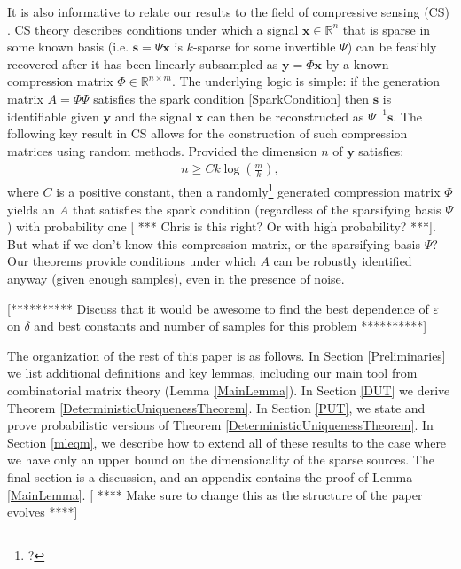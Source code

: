 \documentclass[journal, onecolumn]{IEEEtran}
\begin{document}
It is also informative to relate our results to the field of compressive sensing (CS) \cite{?}. CS theory describes conditions under which a signal $\mathbf{x} \in \mathbb{R}^n$ that is sparse in some known basis (i.e. $\mathbf{s} = \Psi \mathbf{x}$ is $k$-sparse for some invertible $\Psi$) can be feasibly recovered after it has been linearly subsampled as $\mathbf{y} = \Phi \mathbf{x}$ by a known compression matrix $\Phi \in \mathbb{R}^{n \times m}$. The underlying logic is simple: if the generation matrix $A = \Phi\Psi$ satisfies the spark condition \eqref{SparkCondition} then $\mathbf{s}$ is identifiable given $\mathbf{y}$ and the signal $\mathbf{x}$ can then be reconstructed as $\Psi^{-1}\mathbf{s}$. The following key result in CS allows for the construction of such compression matrices using random methods. Provided the dimension $n$ of $\mathbf{y}$ satisfies:
\begin{align}\label{CScondition}
n \geq Ck\log\left(\frac{m}{k}\right),
\end{align}
%
where $C$ is a positive constant, then a randomly\footnote{?} generated compression matrix $\Phi$ yields an $A$ that satisfies the spark condition (regardless of the sparsifying basis $\Psi$) with probability one [ *** Chris is this right? Or with high probability? ***]. But what if we don't know this compression matrix, or the sparsifying basis $\Psi$? Our theorems provide conditions under which $A$ can be robustly identified anyway (given enough samples), even in the presence of noise. 


[********** Discuss that it would be awesome to find the best dependence of $\varepsilon$ on $\delta$ and best constants and number of samples for this problem **********]

The organization of the rest of this paper is as follows. In Section \ref{Preliminaries} we list additional definitions and key lemmas, including our main tool from combinatorial matrix theory (Lemma \ref{MainLemma}). In Section \ref{DUT} we derive Theorem \ref{DeterministicUniquenessTheorem}. In Section \ref{PUT}, we state and prove probabilistic versions of Theorem \ref{DeterministicUniquenessTheorem}. In Section \ref{mleqm}, we describe how to extend all of these results to the case where we have only an upper bound on the dimensionality of the sparse sources. The final section is a discussion, and an appendix contains the proof of Lemma \ref{MainLemma}.
[ **** Make sure to change this as the structure of the paper evolves ****]
\end{document}
